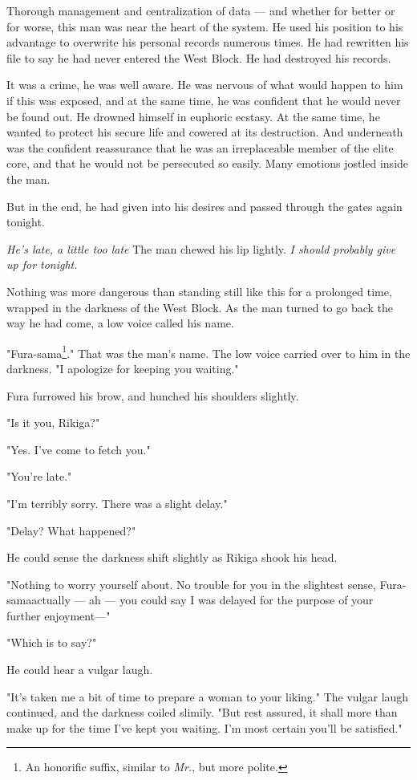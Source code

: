 Thorough management and centralization of data --- and whether for better
or for worse, this man was near the heart of the system. He used his
position to his advantage to overwrite his personal records numerous
times. He had rewritten his file to say he had never entered the West
Block. He had destroyed his records.

It was a crime, he was well aware. He was nervous of what would happen
to him if this was exposed, and at the same time, he was confident that
he would never be found out. He drowned himself in euphoric ecstasy. At
the same time, he wanted to protect his secure life and cowered at its
destruction. And underneath was the confident reassurance that he was an
irreplaceable member of the elite core, and that he would not be
persecuted so easily. Many emotions jostled inside the man.

But in the end, he had given into his desires and passed through the
gates again tonight.

\emph{He's late, a little too late\el } The man chewed his lip lightly.
\emph{I should probably give up for tonight.}

Nothing was more dangerous than standing still like this for a prolonged
time, wrapped in the darkness of the West Block. As the man turned to go
back the way he had come, a low voice called his name.

"Fura-sama\footnote{An honorific suffix, similar to \emph{Mr.}, but more polite.}." That was the man's name. The low voice carried over to him
in the darkness. "I apologize for keeping you waiting."

Fura furrowed his brow, and hunched his shoulders slightly.

"Is it you, Rikiga?"

"Yes. I've come to fetch you."

"You're late."

"I'm terribly sorry. There was a slight delay."

"Delay? What happened?"

He could sense the darkness shift slightly as Rikiga shook his head.

"Nothing to worry yourself about. No trouble for you in the slightest
sense, Fura-sama\el actually --- ah --- you could say I was delayed for the
purpose of your further enjoyment---"

"Which is to say?"

He could hear a vulgar laugh.

"It's taken me a bit of time to prepare a woman to your liking." The
vulgar laugh continued, and the darkness coiled slimily. "But rest
assured, it shall more than make up for the time I've kept you waiting.
I'm most certain you'll be satisfied."

